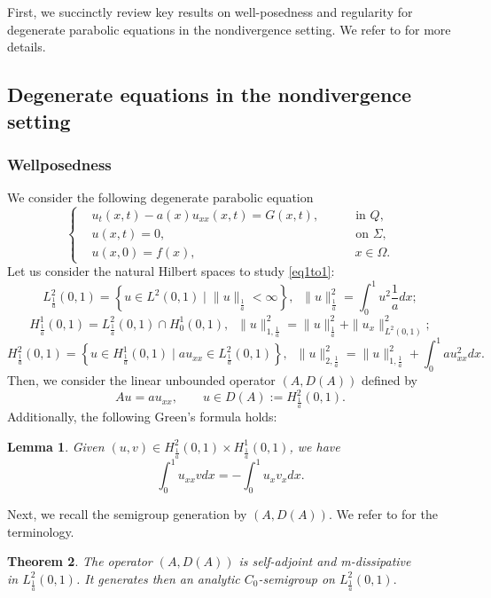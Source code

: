 \documentclass[reqno]{amsart}
\theoremstyle{plain}
\newtheorem{theorem}{Theorem}[section]
\newtheorem{lemma}[theorem]{Lemma}
\theoremstyle{remark}
\numberwithin{equation}{section}
\begin{document}
First, we succinctly review key results on well-posedness and regularity for degenerate parabolic equations in the nondivergence setting. We refer to \cite{CFR08} for more details.

\subsection{Degenerate equations in the nondivergence setting}
\subsubsection{\bf Wellposedness}
We consider the following degenerate parabolic equation 
\begin{equation}
\left\{
\begin{aligned}
& u_{t}(x,t) -a(x) u_{xx}(x,t)= G(x,t), &&\quad \text { in } Q,\\
& u(x,t)=0, &&\quad \text{ on } \Sigma,\\
&u(x,0)=f(x), &&\;\quad x\in \Omega.
\label{eq1to1}
\end{aligned}
\right.
\end{equation}
Let us consider the natural Hilbert spaces to study \eqref{eq1to1}:
$$L^2_{\frac{1}{a}}(0,1)=\left\lbrace u 
 \in L^2(0,1)\; |\;\|u\|_{\frac{1}{a}}<\infty \right\rbrace, \; \; \|u\|_{\frac{1}{a}}^2=\int_{0}^1u^2 \frac{1}{a} dx;$$
$$H^1_{\frac{1}{a}}(0,1)=L^2_{\frac{1}{a}}(0,1) \cap H^1_{0}(0,1), \; \; \|u\|_{1,\frac{1}{a}}^2= \|u\|_{\frac{1}{a}}^2+\| u_{x}\|_{L^2(0,1)}^2;$$
$$H^2_{\frac{1}{a}}(0,1)=\left\lbrace u 
 \in H^1_{\frac{1}{a}}(0,1)\; | \; a u_{xx}\in L^2_{\frac{1}{a}}(0,1)\right\rbrace, \; \; \|u\|_{2,\frac{1}{a}}^2= \|u\|_{1,\frac{1}{a}}^2+\int_{0}^1 au_{xx}^2  dx.$$
Then, we consider the linear unbounded operator $(A,D(A))$ defined by
$$ Au=au_{xx}, \qquad u \in  D(A):= H^2_{\frac{1}{a}}(0,1).$$
Additionally, the following Green's formula holds:
\begin{lemma}
     Given $(u,v) \in H^2_{\frac{1}{a}}(0,1) \times H^1_{\frac{1}{a}}(0,1)$, we have 
     $$ \int_{0}^1 u_{xx}v dx= - \int_{0}^1 u_{x}v_{x} dx .$$
\end{lemma}
Next, we recall the semigroup generation by $(A,D(A))$. We refer to \cite{Paz83} for the terminology.
\begin{theorem}\label{thmg1}
The operator $(A,D(A))$ is self-adjoint and m-dissipative \\ in $L_{\frac{1}{a}}^2(0,1)$. It generates then an analytic $C_0$-semigroup on $L_{\frac{1}{a}}^2(0,1).$
\end{theorem}
\end{document}
